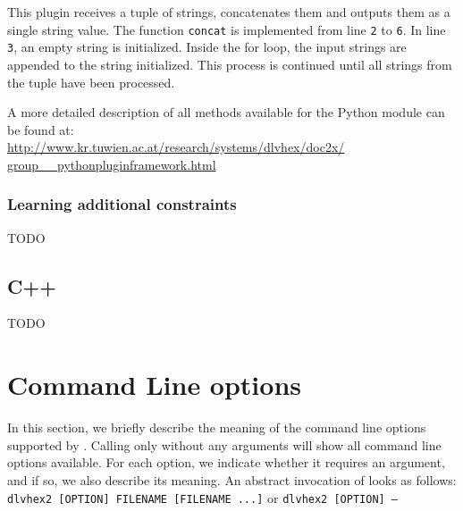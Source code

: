 \documentclass[a4paper, titlepage]{article}
\begin{document}
This plugin receives a tuple of strings, concatenates 
them and outputs them as a single string value. The function \verb+concat+ is implemented from line \verb+2+ to \verb+6+. In line \verb+3+, an 
empty string is initialized. Inside the for loop, the input 
strings are appended to the string initialized. This process 
is continued until all strings from the tuple have been processed.  
 
A more detailed description of all methods available for the \dlvhex{} Python module can be found at:\\ \url{http://www.kr.tuwien.ac.at/research/systems/dlvhex/doc2x/}\\
\url{group__pythonpluginframework.html}

\subsubsection{Learning additional constraints}
TODO

\subsection{C++}
TODO

\section{Command Line options}
\label{sec:commandline}
In this section, we briefly describe the meaning of the command line options supported by \dlvhex{}. 
Calling only \dlvhex{} without any arguments will show all 
command line options available. For each option, we indicate whether it requires an argument, and if so, we also describe its meaning. An abstract invocation of \dlvhex{} looks as follows:\\
\texttt{dlvhex2 [OPTION] FILENAME [FILENAME ...]} or \texttt{dlvhex2 [OPTION] --}
\end{document}
